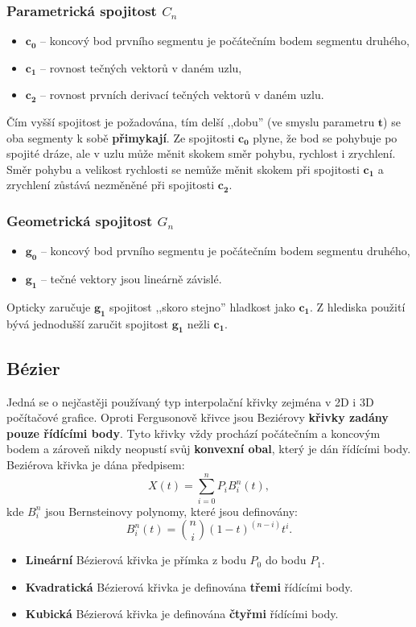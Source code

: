 \subsubsection{Parametrická spojitost $C_n$}
	\begin{itemize}
	\item $\mathbf{c_0}$ -- koncový bod prvního segmentu je počátečním bodem segmentu druhého,	
	\item $\mathbf{c_1}$ -- rovnost tečných vektorů v daném uzlu, 		
	\item $\mathbf{c_2}$ -- rovnost prvních derivací tečných vektorů v daném uzlu.
	\end{itemize}
Čím vyšší spojitost je požadována, tím delší ,,dobu'' (ve smyslu parametru $\mathbf{t}$) se oba segmenty k sobě \textbf{přimykají}. Ze spojitosti $\mathbf{c_0}$ plyne, že bod se pohybuje po spojité dráze, ale v uzlu může měnit skokem směr pohybu, rychlost i zrychlení. Směr pohybu a velikost rychlosti se nemůže měnit skokem při spojitosti $\mathbf{c_1}$ a zrychlení zůstává nezměněné při spojitosti $\mathbf{c_2}$.

\subsubsection{Geometrická spojitost $G_n$}
	\begin{itemize}
		\item $\mathbf{g_0}$ -- koncový bod prvního segmentu je počátečním bodem segmentu druhého,
		\item $\mathbf{g_1}$ -- tečné vektory jsou lineárně závislé.
	\end{itemize}
Opticky zaručuje $\mathbf{g_1}$ spojitost ,,skoro stejno'' hladkost jako $\mathbf{c_1}$. Z hlediska použití bývá jednodušší zaručit spojitost $\mathbf{g_1}$ nežli $\mathbf{c_1}$.

\subsection{Bézier}
Jedná se o nejčastěji používaný typ interpolační křivky zejména v 2D i 3D počítačové grafice. Oproti Fergusonově křivce jsou Beziérovy \textbf{křivky zadány pouze řídícími body}. Tyto křivky vždy prochází počátečním a koncovým bodem a zároveň nikdy neopustí svůj \textbf{konvexní obal}, který je dán řídícími body. Beziérova křivka je dána předpisem:
\begin{equation*}\label{rovnice_bezier}
X(t) = \sum_{i=0}^{n}P_iB_i^n(t),
\end{equation*}
kde $B_i^n$ jsou Bernsteinovy polynomy, které jsou definovány:
\begin{equation*}
B_i^n(t) = \binom{n}{i}(1 - t)^{(n - i)}t^i.
\end{equation*}
\begin{itemize}
\item \textbf{Lineární} Bézierová křivka je přímka z bodu $P_{0}$ do bodu $P_{1}$.
\item \textbf{Kvadratická} Bézierová křivka je definována \textbf{třemi} řídícími body.
\item \textbf{Kubická} Bézierová křivka je definována \textbf{čtyřmi} řídícími body.
\end{itemize}

